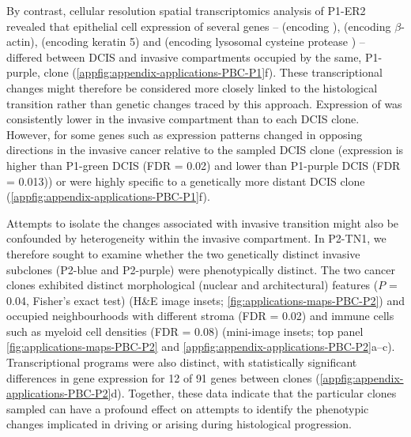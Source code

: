By contrast, cellular resolution spatial transcriptomics analysis of P1-ER2 revealed that epithelial cell expression of several genes --  (encoding ),  (encoding $\beta$-actin),  (encoding keratin 5) and  (encoding lysosomal cysteine protease ) -- differed between \ac{DCIS} and invasive compartments occupied by the same, P1-purple, clone (\cref{appfig:appendix-applications-PBC-P1}f). These transcriptional changes might therefore be considered more closely linked to the histological transition rather than genetic changes traced by this approach. Expression of  was consistently lower in the invasive compartment than to each \ac{DCIS} clone. However, for some genes such as  expression patterns changed in opposing directions in the invasive cancer relative to the sampled \ac{DCIS} clone (expression is higher than P1-green \ac{DCIS} (\ac{FDR} = 0.02) and lower than P1-purple \ac{DCIS} (\ac{FDR} = 0.013)) or were highly specific to a genetically more distant \ac{DCIS} clone (\cref{appfig:appendix-applications-PBC-P1}f).

Attempts to isolate the changes associated with invasive transition might also be confounded by heterogeneity within the invasive compartment. In P2-TN1, we therefore sought to examine whether the two genetically distinct invasive subclones (P2-blue and P2-purple) were phenotypically distinct. The two cancer clones exhibited distinct morphological (nuclear and architectural) features ($P$ = 0.04, Fisher’s exact test) (H\&E image insets; \cref{fig:applications-maps-PBC-P2}) and occupied neighbourhoods with different stroma (\ac{FDR} = 0.02) and immune cells such as myeloid cell densities (\ac{FDR} = 0.08) (mini-image insets; top panel \cref{fig:applications-maps-PBC-P2} and \cref{appfig:appendix-applications-PBC-P2}a–c). Transcriptional programs were also distinct, with statistically significant differences in gene expression for 12 of 91 genes between clones (\cref{appfig:appendix-applications-PBC-P2}d). Together, these data indicate that the particular clones sampled can have a profound effect on attempts to identify the phenotypic changes implicated in driving or arising during histological progression.

